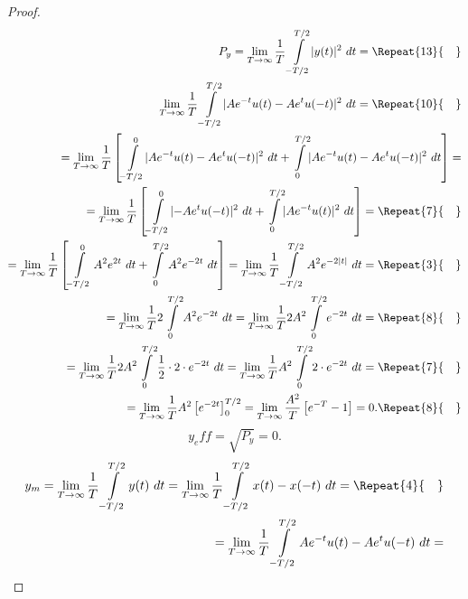 \documentclass[12pt,oneside,openany]{memoir}
\numberwithin{equation}{subsection}
\DeclarePairedDelimiter{\abs}{\lvert}{\rvert}
\newcommand{\quads}[1]{\Repeat{#1}{\quad}}
\newcommand{\dt}{\ dt}
\begin{document}
\begin{proof}
\begin{equation}
\begin{split}
	P_y = \lim_{T \rightarrow \infty} \frac{1}{T} \int\displaylimits_{-T/2}^{T/2} \abs{y(t)}^2 \dt =
	\quads{13}
	\\
	\lim_{T \rightarrow \infty} \frac{1}{T} \int\displaylimits_{-T/2}^{T/2} \abs{A e^{-t} u(t) - A e^t u(-t)}^2 \dt =
	\quads{10}
	\\
	= \lim_{T \rightarrow \infty} \frac{1}{T} \left[\int\displaylimits_{-T/2}^{0} \abs{A e^{-t} u(t) - A e^t u(-t)}^2 \dt + \int\displaylimits_{0}^{T/2} \abs{A e^{-t} u(t) - A e^t u(-t)}^2 \dt \right] =
	\\
	= \lim_{T \rightarrow \infty} \frac{1}{T} \left[\int\displaylimits_{-T/2}^{0} \abs{- A e^t u(-t)}^2 \dt + \int\displaylimits_{0}^{T/2} \abs{A e^{-t} u(t)}^2 \dt \right] =
	\quads{7}
	\\
	= \lim_{T \rightarrow \infty} \frac{1}{T} \left[\int\displaylimits_{-T/2}^{0} A^2 e^{2t} \dt + \int\displaylimits_{0}^{T/2} A^2 e^{-2t} \dt \right] 	= \lim_{T \rightarrow \infty} \frac{1}{T} \int\displaylimits_{-T/2}^{T/2} A^2 e^{-2\abs{t}} \dt =
	\quads{3}
	\\
	= \lim_{T \rightarrow \infty} \frac{1}{T} 2 \int\displaylimits_{0}^{T/2} A^2 e^{-2t} \dt = \lim_{T \rightarrow \infty} \frac{1}{T} 2 A^2 \int\displaylimits_{0}^{T/2} e^{-2t} \dt =
	\quads{8}
	\\
	= \lim_{T \rightarrow \infty} \frac{1}{T} 2 A^2 \int\displaylimits_{0}^{T/2} \frac{1}{2} \cdot 2 \cdot e^{-2t} \dt = \lim_{T \rightarrow \infty} \frac{1}{T} A^2 \int\displaylimits_{0}^{T/2} 2 \cdot e^{-2t} \dt =
	\quads{7}
	\\
	= \lim_{T \rightarrow \infty} \frac{1}{T} A^2 \left[e^{-2t}\right]_0^{T/2} = \lim_{T \rightarrow \infty} \frac{A^2}{T} \left[e^{-T} - 1\right] = 0.
	\quads{8}
\end{split}
\end{equation}
\begin{equation}
	y_eff = \sqrt{P_y} = 0.
\end{equation}
\begin{equation}
\begin{split}
	y_m = \lim_{T \rightarrow \infty} \frac{1}{T} \int\displaylimits_{-T/2}^{T/2} y(t) \dt = \lim_{T \rightarrow \infty} \frac{1}{T} \int\displaylimits_{-T/2}^{T/2} x(t) - x(-t) \dt =
	\quads{4}
	\\
	= \lim_{T \rightarrow \infty} \frac{1}{T} \int\displaylimits_{-T/2}^{T/2} A e^{-t} u(t) - A e^{t} u(-t) \dt =

\end{split}
\end{equation}
\end{proof}
\end{document}
